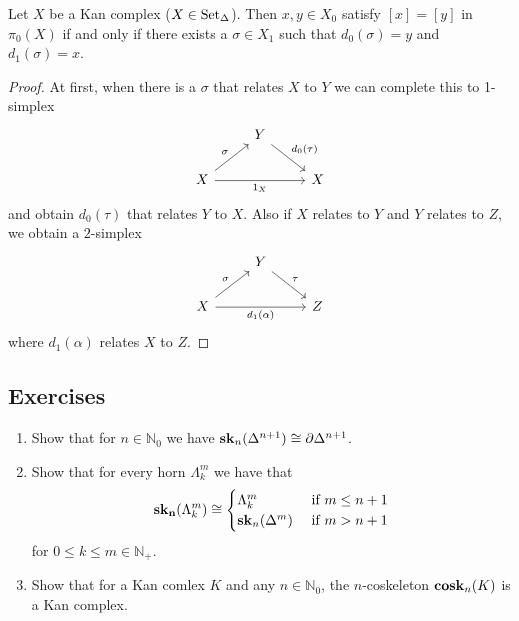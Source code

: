\begin{prop}
    Let $X$ be a Kan complex ($X \in \operatorname{Set}_{\Delta}$).
    Then $x,y \in X_0$ satisfy $[x]=[y]$ in $\pi_0(X)$ if and only if there exists a $\sigma \in X_1$ such that $d_0(\sigma)=y$ and $d_1(\sigma)=x$.
\end{prop}

\begin{proof}
    At first, when there is a $\sigma$ that relates $X$ to $Y$ we can complete this to 1-simplex
    \[
    \begin{tikzcd}
        &
        Y
        \ar[rd, "d_0(\tau)"]
        &
        \\
        X
        \ar[ru,"\sigma"]
        \ar[rr,"1_X"']
        &&
        X
    \end{tikzcd}
    \]
    and obtain $d_0(\tau)$ that relates $Y$ to $X$.
    Also if $X$ relates to $Y$ and $Y$ relates to $Z$, we obtain a $2$-simplex
    \[
    \begin{tikzcd}
        &
        Y
        \ar[rd, "\tau"]
        &
        \\
        X
        \ar[ru,"\sigma"]
        \ar[rr,"d_1(\alpha)"']
        &&
        Z
    \end{tikzcd}
    \]
    where $d_1(\alpha)$ relates $X$ to $Z$.
\end{proof}

\subsection{Exercises}

\begin{Exercise}
    \begin{enumerate}[label=(\alph*)]
        
        \item 
        Show that for $ n \in \mathbb{N}_0 $ we have $ \bold{sk}_n ( \Delta^{n+1} ) \cong \partial \Delta^{n+1}$.
    
        \item 
        Show that for every horn $ \Lambda_k^m $ we have that 
        \[
            \bold{sk_n} ( \Lambda_k^m ) \cong 
            \begin{cases}
                \Lambda_k^m &\text{ if } m \leq n+1
                \\
                \bold{sk}_n ( \Delta^m ) &\text{ if } m > n+1
            \end{cases}
        \]
        for $ 0 \leq k \leq m \in \mathbb{ N }_+$.
    
        \item 
        Show that for a Kan comlex $ K $ and any $ n \in \mathbb{N}_0 $, the $ n $-coskeleton $\bold{cosk}_n ( K ) $ is a Kan complex.
        
    \end{enumerate}
\end{Exercise}

